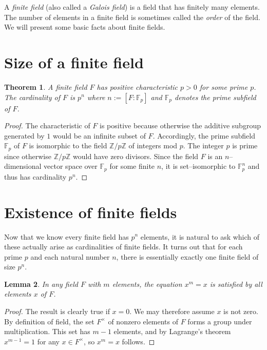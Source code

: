 \documentclass[12pt]{article}
\newcommand{\Z}{\mathbb{Z}}
\newcommand{\F}{\mathbb{F}}
\newtheorem{theorem}{Theorem}[section]
\newtheorem{lemma}[theorem]{Lemma}
\theoremstyle{definition}
\begin{document}

A \emph{finite field} (also called a \emph{Galois field}) is a field that has finitely many elements.
The number of elements in a finite field is sometimes called the \emph{order} of the field.
We will present some basic facts about finite fields.

\section{Size of a finite field}

\begin{theorem}
A finite field $F$ has positive characteristic $p > 0$ for some prime $p$. The
cardinality of $F$ is $p^n$ where $n := [F:\F_p]$ and $\F_p$ denotes
the prime subfield of $F$.
\end{theorem}
\begin{proof}
The characteristic of $F$ is positive because otherwise the additive
subgroup generated by $1$ would be an infinite subset of
$F$. Accordingly, the prime subfield $\F_p$ of $F$ is isomorphic to
the field $\Z/p\Z$ of integers mod $p$. The integer $p$ is prime since otherwise $\Z/p\Z$ would have zero divisors. Since the field $F$ is an
$n$--dimensional vector space over $\F_p$ for some finite $n$, it is set--isomorphic to
$\F_p^n$ and thus has cardinality $p^n$.
\end{proof}

\section{Existence of finite fields}

Now that we know every finite field has $p^n$ elements, it is natural
to ask which of these actually arise as cardinalities of finite
fields. It turns out that for each prime $p$ and each natural number
$n$, there is essentially exactly one finite field of size $p^n$.

\begin{lemma}\label{fermat}
In any field $F$ with $m$ elements, the equation $x^m = x$ is satisfied by all elements $x$ of $F$.
\end{lemma}
\begin{proof}
The result is clearly true if $x = 0$. We may therefore assume $x$ is not zero. By definition of field, the set $F^\times$ of nonzero elements of $F$ forms a group under multiplication. This set has $m-1$ elements, and by Lagrange's theorem $x^{m-1} = 1$ for any $x \in F^\times$, so $x^m = x$ follows.
\end{proof}
\end{document}
